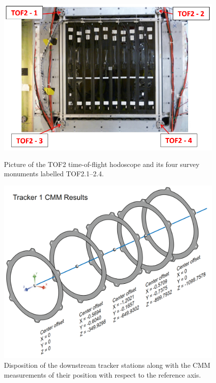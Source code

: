 \begin{figure}[!htb]
	\begin{minipage}[b]{.5\textwidth}
		\centering
		\includegraphics[width=\textwidth]{tof2_monuments.png}
		\caption{Picture of the TOF2 time-of-flight hodoscope and its four survey monuments labelled TOF2.1--2.4.}
		\label{fig:tof2_monuments}
	\end{minipage}
	\hfill
	\begin{minipage}[b]{.45\textwidth}
		\centering
		\includegraphics[width=\textwidth]{cmm_measurements.pdf}
		\caption{Disposition of the downstream tracker stations along with the CMM measurements of their position with respect to the reference axis.}
		\label{fig:cmm_measurements}
	\end{minipage}
\end{figure}

